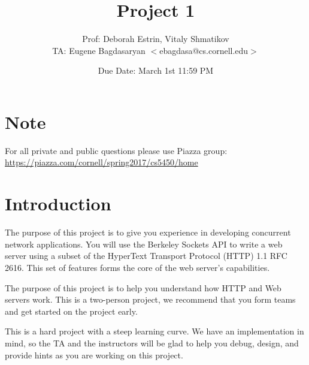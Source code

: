 \documentclass[12pt]{article}
\title{Project 1}
\author{Prof: Deborah Estrin, Vitaly Shmatikov \\ TA: Eugene Bagdasaryan $<$ebagdasa@cs.cornell.edu$>$ \\ }
\date{Due Date: March 1st 11:59 PM}
\begin{document}
\maketitle

\section{Note}

For all private and public questions please use Piazza group: \\
\url{https://piazza.com/cornell/spring2017/cs5450/home}

\section{Introduction}
The purpose of this project is to give you experience in developing
concurrent network applications. You will use the Berkeley Sockets
API to write a web server using a subset of the HyperText Transport
Protocol (HTTP) 1.1 RFC 2616.  This set of features forms the core of
the web server’s capabilities.

The purpose of this project is to help you understand how HTTP and Web
servers work.  This is a two-person project, we recommend that you form
teams and get started on the project early.

This is a hard project with a steep learning curve.  We have an
implementation in mind, so the TA and the instructors will be glad to help
you debug, design, and provide hints as you are working on this project.
\end{document}
